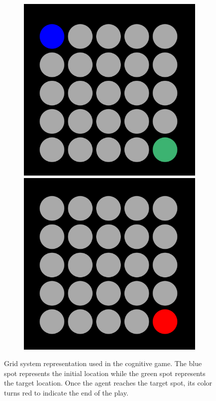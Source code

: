 \documentclass[journal]{IEEEtran}
\begin{document}
{\begin{figure}[h!]
\begin{subfigure}{0.5\textwidth}
\centering
\includegraphics[scale=0.2]{Images/grid_initial_state.png}
\includegraphics[scale=0.2]{Images/grid_end_state.png}
\end{subfigure}
\centering
\caption{Grid system representation used in the cognitive game. The blue spot represents the initial location while the green spot represents the target location. Once the agent reaches the target spot, its color turns red to indicate the end of the play.}
\label{fig:game_representation}
\end{figure}

}
\end{document}
